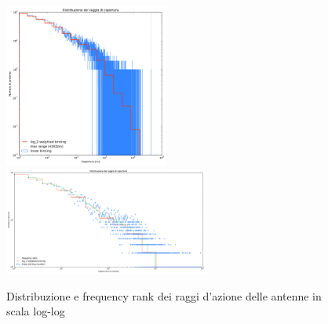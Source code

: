 \begin{figure}[b!]
	\centering
	\subfloat
	{\includegraphics[width=0.48\textwidth]{./Immagini/Dati/logbin}}
	\\
	\subfloat
	{\includegraphics[width=0.6\textwidth]{./Immagini/Dati/rangefreqrank}}
	\caption[Distribuzione raggi.]{Distribuzione e frequency rank dei raggi d'azione delle antenne in scala log-log}
	\label{fig:ranges}
\end{figure} 
 

